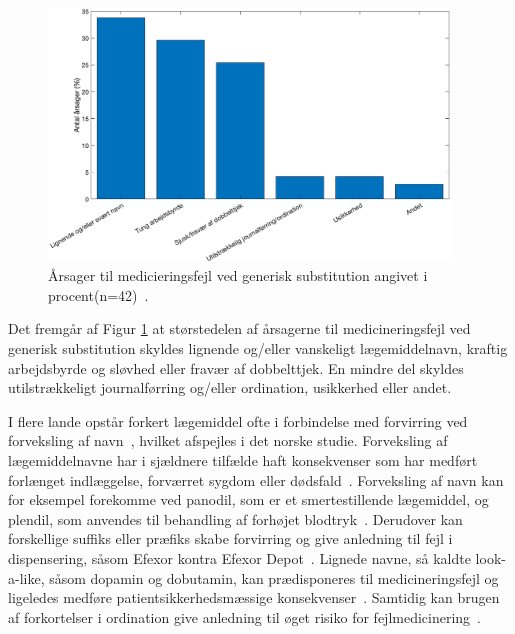 \begin{figure}[H]\centering	\includegraphics[width=0.95\textwidth]{billeder/GenSubbb.png} 
	\caption{Årsager til medicieringsfejl ved generisk substitution angivet i procent(n=42)~\citep{Hakonsen2010}.}	\label{fig:GeneriskSubstitution1}  
\end{figure}

Det fremgår af Figur \ref{fig:GeneriskSubstitution1} at størstedelen af årsagerne til medicineringsfejl ved generisk substitution skyldes lignende og/eller vanskeligt lægemiddelnavn, kraftig arbejdsbyrde og sløvhed eller fravær af dobbelttjek. En mindre del skyldes utilstrækkeligt journalførring og/eller ordination, usikkerhed eller andet. 

I flere lande opstår forkert lægemiddel ofte i forbindelse med forvirring ved forveksling af navn~\citep{DanskSelskabforPatientsikkerhed2009}, hvilket afspejles i det norske studie. Forveksling af lægemiddelnavne har i sjældnere tilfælde haft konsekvenser som har medført forlænget indlæggelse, forværret sygdom eller dødsfald~\citep{DanskSelskabforPatientsikkerhed2009}. Forveksling af navn kan for eksempel forekomme ved panodil, som er et smertestillende lægemiddel, og plendil, som anvendes til behandling af forhøjet blodtryk~\citep{DanskSelskabforPatientsikkerhed2009}. Derudover kan forskellige suffiks eller præfiks skabe forvirring og give anledning til fejl i dispensering, såsom Efexor kontra Efexor Depot~\citep{DanskSelskabforPatientsikkerhed2009}. Lignede navne, så kaldte look-a-like, såsom dopamin og dobutamin, kan prædisponeres til medicineringsfejl og ligeledes medføre patientsikkerhedsmæssige konsekvenser~\citep{Wittich2014}. Samtidig kan brugen af forkortelser i ordination give anledning til øget risiko for fejlmedicinering~\citep{Wittich2014}.


